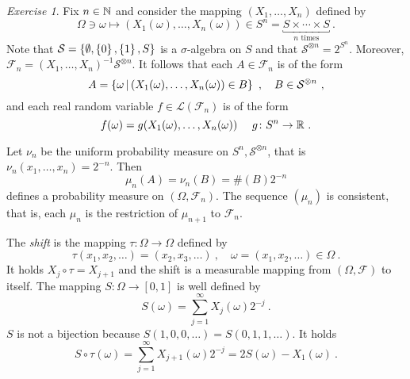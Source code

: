 \documentclass[12pt,a4paper]{amsart}
\theoremstyle{plain}
\theoremstyle{definition}
\theoremstyle{remark}
\newtheorem{exercise}[theorem]{Exercise}
\begin{document}
\begin{exercise}
Fix $n \in \mathbb{N}$ and consider the mapping
$(X_1,\dots,X_n)$ defined by
\begin{equation*}
  \Omega \ni \omega \mapsto (X_1(\omega),\dots,X_n(\omega)) \in
  S^{n} = \underbracket{S \times \cdots \times S}_{\text{$n$ times}} \ .
\end{equation*}
Note that $\mathcal S = \left\{\emptyset, \left\{0\right\}, \left\{1\right\}, S\right\}$ is a
$\sigma$-algebra on $S$ and that $\mathcal S^{\otimes n} =
2^{S^n}$. Moreover, $\mathcal F_n = (X_1,\dots,X_n)^{-1} \mathcal
S^{\otimes n}$. It follows that each $A \in \mathcal F_n$ is of the form
\begin{equation*}
  A = \left\{\omega \, \middle| \, (X_1(\omega),\dots,X_n(\omega)) \in B \right\} \ , \quad
    B \in \mathcal S^{\otimes n} \ ,
  \end{equation*}
  and each real random variable $f \in \mathcal L(\mathcal
  F_n)$ is of the form
  \begin{equation*}
    f(\omega) = g(X_1(\omega),\dots,X_n(\omega)) \ \quad g \colon S^n
    \to \reals \ .
  \end{equation*}

Let $\nu_n$ be the uniform probability measure on
$S^n,\mathcal S^{\otimes n}$, that is $\nu_n(x_1,\dots,x_n) = 2^{-n}$. Then
\begin{equation*}
  \mu_n(A) = \nu_n(B) = \#(B) 2^{-n}
\end{equation*}
defines a probability measure on $(\Omega, \mathcal F_n)$. The
sequence $(\mu_n)$ is consistent, that is, each $\mu_n$ is
the restriction of $\mu_{n+1}$ to $\mathcal F_n$.

The \emph{shift} is the mapping $\tau \colon \Omega \to \Omega$
defined by 
\begin{equation*}
  \tau(x_1,x_2,\dots) = (x_2,x_3,\dots) \ , \quad \omega =
  (x_1,x_2,\dots) \in \Omega \ .
\end{equation*}
It holds $X_j\circ \tau = X_{j+1}$ and the shift is a measurable
mapping from $(\Omega, \mathcal F)$ to itself. The mapping $S \colon
\Omega \to [0,1]$ is well defined by
\begin{equation*}
  S(\omega) = \sum_{j=1}^\infty X_j(\omega) 2^{-j} \ .
\end{equation*}
$S$ is not a bijection because $S(1,0,0,\dots) = S(0,1,1,\dots)$. It holds
\begin{equation*}
  S\circ \tau (\omega) = \sum_{j=1}^\infty X_{j+1}(\omega) 2^{-j} = 2
  S(\omega) - X_1(\omega) \ .
\end{equation*}


\end{exercise}
\end{document}
